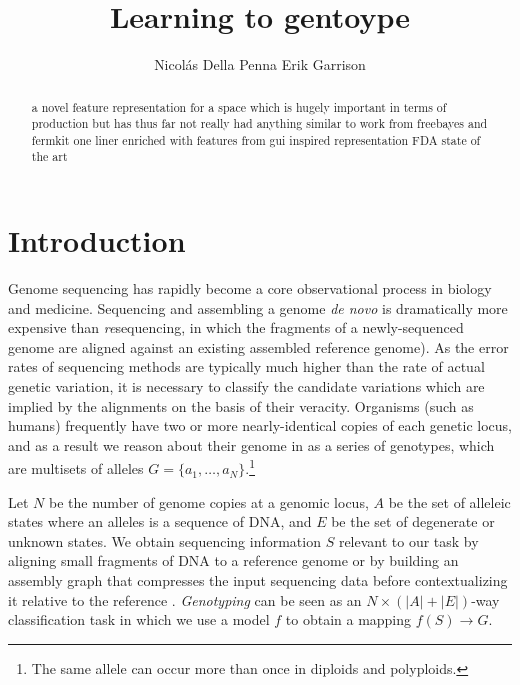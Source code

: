 \documentclass{article}
\title{Learning to gentoype}
\author{
Nicol\'as Della Penna
\And
Erik Garrison \\
} %
\begin{document}

\maketitle

\begin{abstract}
a novel feature representation
for a space which is hugely important in terms of production
but has thus far not really had anything similar to work from
freebayes and fermkit one liner
enriched with features from gui inspired representation
FDA state of the art
\end{abstract}

\section{Introduction}



Genome sequencing has rapidly become a core observational process in biology and medicine.
Sequencing and assembling a genome \emph{de novo} is dramatically more expensive than \emph{re}sequencing, in which the fragments of a newly-sequenced genome are aligned against an existing assembled reference genome).
As the error rates of sequencing methods are typically much higher than the rate of actual genetic variation, it is necessary to classify the candidate variations which are implied by the alignments on the basis of their veracity.
Organisms (such as humans) frequently have two or more nearly-identical copies of each genetic locus, and as a result we reason about their genome in as a series of genotypes, which are multisets of alleles $G = \{ a_1, \ldots, a_N \}$.\footnote{The same allele can occur more than once in diploids and polyploids.} 

Let $N$ be the number of genome copies at a genomic locus, $A$ be the set of alleleic states where an alleles is a sequence of DNA, and $E$ be the set of degenerate or unknown states.
We obtain sequencing information $S$ relevant to our task by aligning small fragments of DNA to a reference genome \cite{li2013bwamem} or by building an assembly graph that compresses the input sequencing data before contextualizing it relative to the reference \cite{myers2005, simpson2010, li2015fermikit, iqbal2012}.
\emph{Genotyping} can be seen as an $N \times ( |A| + |E| )$-way classification task in which we use a model $f$ to obtain a mapping $f(S) \to G$.
\end{document}
